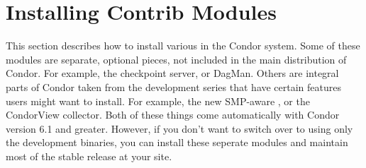 \section{\label{sec:Contrib-Install}Installing Contrib Modules}

This section describes how to install various 
in the Condor system.
Some of these modules are separate, optional pieces, not included in
the main distribution of Condor.
For example, the checkpoint server, or DagMan.
Others are integral parts of Condor taken from the development series
that have certain features users might want to install.
For example, the new SMP-aware , or the CondorView
collector.  
Both of these things come automatically with Condor version 6.1 and
greater.
However, if you don't want to switch over to using only the
development binaries, you can install these seperate modules and
maintain most of the stable release at your site.








